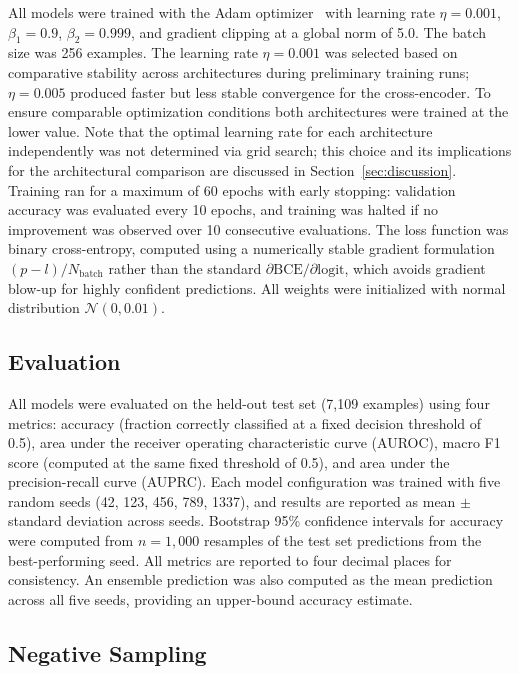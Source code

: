 \documentclass[journal]{IEEEtran}
\begin{document}
All models were trained with the Adam optimizer~\cite{kingma2014} with learning
rate $\eta = 0.001$, $\beta_1 = 0.9$, $\beta_2 = 0.999$, and gradient
clipping at a global norm of 5.0. The batch size was 256 examples. The
learning rate $\eta = 0.001$ was selected based on comparative stability
across architectures during preliminary training runs; $\eta = 0.005$ produced
faster but less stable convergence for the cross-encoder. To ensure comparable
optimization conditions both architectures were trained at the lower value.
Note that the optimal learning rate for each architecture independently was
not determined via grid search; this choice and its implications for the
architectural comparison are discussed in Section~\ref{sec:discussion}.
Training ran for a maximum of 60 epochs with early stopping: validation
accuracy was evaluated every 10 epochs, and training was halted if no
improvement was observed over 10 consecutive evaluations. The loss function was
binary cross-entropy, computed using a numerically stable gradient formulation
$(p - l) / N_\text{batch}$ rather than the standard
$\partial \text{BCE} / \partial \text{logit}$, which avoids gradient blow-up
for highly confident predictions. All weights were initialized with normal
distribution $\mathcal{N}(0, 0.01)$.

\subsection{Evaluation}
\label{ssec:eval}

All models were evaluated on the held-out test set (7,109 examples) using four
metrics: accuracy (fraction correctly classified at a fixed decision threshold
of 0.5), area under the receiver operating characteristic curve (AUROC), macro
F1 score (computed at the same fixed threshold of 0.5), and area under the
precision-recall curve (AUPRC). Each
model configuration was trained with five random seeds (42, 123, 456, 789,
1337), and results are reported as mean $\pm$ standard deviation across seeds.
Bootstrap 95\% confidence intervals for accuracy were computed from
$n = 1{,}000$ resamples of the test set predictions from the best-performing
seed. All metrics are reported to four decimal places for consistency. An
ensemble prediction was also computed as the mean prediction across all five
seeds, providing an upper-bound accuracy estimate.

\subsection{Negative Sampling}
\label{ssec:negsampling}
\end{document}
